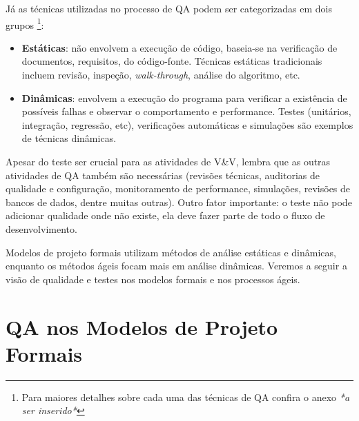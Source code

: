 \documentclass[
	12pt,				%
	openright,			%
	oneside,			%
	a4paper,			%
	english,			%
	brazil,				%
	]{abntex2}
\begin{document}
Já as técnicas utilizadas no processo de QA podem ser categorizadas em dois grupos \cite{Huo:2004:SQA:1025117.1025549,Naik2011}\footnote{Para maiores detalhes sobre cada uma das técnicas de QA confira o anexo \emph{*a ser inserido*}}: %

\begin{itemize}
    \item \textbf{Estáticas}: não envolvem a execução de código, baseia-se na verificação de documentos, requisitos, do código-fonte. Técnicas estáticas tradicionais incluem revisão, inspeção, \emph{walk-through}, análise do algoritmo, etc.
    \item \textbf{Dinâmicas}: envolvem a execução do programa para verificar a existência de possíveis falhas e observar o comportamento e performance. Testes (unitários, integração, regressão, etc), verificações automáticas e simulações são exemplos de técnicas dinâmicas.
\end{itemize}

Apesar do teste ser crucial para as atividades de V\&V,  lembra que as outras atividades de QA também são necessárias (revisões técnicas, auditorias de qualidade e configuração, monitoramento de performance, simulações, revisões de bancos de dados, dentre muitas outras). Outro fator importante: o teste não pode adicionar qualidade onde não existe, ela deve fazer parte de todo o fluxo de desenvolvimento.


Modelos de projeto formais utilizam métodos de análise estáticas e dinâmicas, enquanto os métodos ágeis focam mais em análise dinâmicas. Veremos a seguir a visão de qualidade e testes nos modelos formais e nos processos ágeis. %

\section{QA nos Modelos de Projeto Formais}
\label{qa-modelos-formais}
\end{document}

